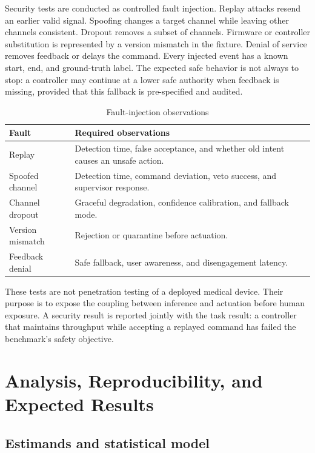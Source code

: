 \documentclass[conference]{IEEEtran}
\begin{document}
Security tests are conducted as controlled fault injection. Replay attacks resend an earlier valid signal. Spoofing changes a target channel while leaving other channels consistent. Dropout removes a subset of channels. Firmware or controller substitution is represented by a version mismatch in the fixture. Denial of service removes feedback or delays the command. Every injected event has a known start, end, and ground-truth label. The expected safe behavior is not always to stop: a controller may continue at a lower safe authority when feedback is missing, provided that this fallback is pre-specified and audited.

\begin{table}[t]
\caption{Fault-injection observations}
\label{tab:faults}
\centering
\scriptsize
\begin{tabular}{p{}p{}}
\toprule
Fault & Required observations\\
\midrule
Replay & Detection time, false acceptance, and whether old intent causes an unsafe action.\\
Spoofed channel & Detection time, command deviation, veto success, and supervisor response.\\
Channel dropout & Graceful degradation, confidence calibration, and fallback mode.\\
Version mismatch & Rejection or quarantine before actuation.\\
Feedback denial & Safe fallback, user awareness, and disengagement latency.\\
\bottomrule
\end{tabular}
\end{table}

These tests are not penetration testing of a deployed medical device. Their purpose is to expose the coupling between inference and actuation before human exposure. A security result is reported jointly with the task result: a controller that maintains throughput while accepting a replayed command has failed the benchmark's safety objective.

\section{Analysis, Reproducibility, and Expected Results}

\subsection{Estimands and statistical model}
\end{document}
